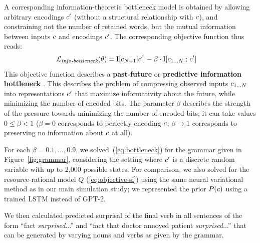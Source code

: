 A corresponding information-theoretic bottleneck model is obtained by allowing arbitrary encodings $c'$ (without a structural relationship with $c$), and constraining not the number of retained words, but the mutual information between inputs $c$ and encodings $c'$.
The corresponding objective function thus reads:
\begin{align}\label{eq:bottleneck}
	\mathcal{L}_\textit{info-bottleneck}(\theta) & = \operatorname{I}[c_{N+1}|c'] - \beta \cdot \operatorname{I}[c_{1\dots N} : c']
\end{align}
This objective function describes a \textbf{past-future} or \textbf{predictive information bottleneck} \citep{tishby2000information, Amir2015PastfutureIB, Marzen2016PredictiveRF, Still2010OptimalCI, Creutzig2009PastfutureIB, hahn2019estimating, Wang2019PastfutureIB}.
This describes the problem of compressing observed inputs $c_{1\dots N}$ into representations $c'$ that maximize informativity about the future, while minimizing the number of encoded bits.
The parameter $\beta$ describes the strength of the pressure towards minimizing the number of encoded bits; it can take values $0 \leq \beta < 1$ ($\beta = 0$ corresponds to perfectly encoding $c$; $\beta\rightarrow 1$ corresponds to preserving no information about $c$ at all).

For each $\beta = 0.1, \dots, 0.9$, we solved~(\ref{eq:bottleneck}) for the grammar given in Figure~\ref{fig:grammar}, considering the setting where $c'$ is a discrete random variable with up to 2,000 possible states.
For comparison, we also solved for the resource-rational model $Q$ (\ref{eq:objective-si}) using the same neural variational method as in our main simulation study; we represented the prior $P(c)$ using a trained LSTM instead of GPT-2.



We then calculated predicted surprisal of the final verb in all sentences of the form ``fact \textit{surprised}...'' and ``fact that doctor annoyed patient \textit{surprised}...''  that can be generated by varying nouns and verbs as given by the grammar.

